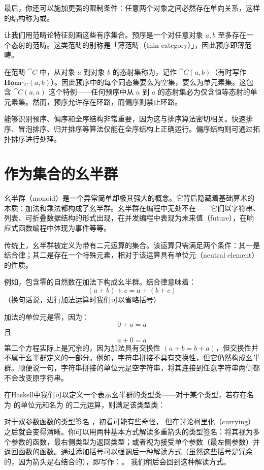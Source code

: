 最后，你还可以施加更强的限制条件：任意两个对象之间必然存在单向关系，这样的结构称为或。

让我们用范畴论特征刻画这些有序集合。预序是一个对任意对象 $a,b$ 至多存在一个态射的范畴。这类范畴的别称是「薄范畴（thin category）」，因此预序即薄范畴。

在范畴 $\cat{C}$ 中，从对象 $a$ 到对象 $b$ 的态射集称为，记作 $\cat{C}(a, b)$（有时写作 $\mathbf{Hom}_{\cat{C}}(a, b)$）。因此预序中的每个同态集要么为空集，要么为单元素集。这包含 $\cat{C}(a, a)$ 这个特例——任何预序中从 $a$ 到 $a$ 的态射集必为仅含恒等态射的单元素集。然而，预序允许存在环路，而偏序则禁止环路。

能够识别预序、偏序和全序结构非常重要，因为这与排序算法密切相关。快速排序、冒泡排序、归并排序等算法仅能在全序结构上正确运行。偏序结构则可通过拓扑排序进行处理。

\section{作为集合的幺半群}

幺半群（monoid）是一个异常简单却极其强大的概念。它背后隐藏着基础算术的本质：加法和乘法都构成了幺半群。幺半群在编程中无处不在——它们以字符串、列表、可折叠数据结构的形式出现，在并发编程中表现为未来值（future），在响应式函数编程中体现为事件等等。

传统上，幺半群被定义为带有二元运算的集合。该运算只需满足两个条件：其一是结合律；其二是存在一个特殊元素，相对于该运算具有单位元（neutral element）的性质。

例如，包含零的自然数在加法下构成幺半群。结合律意味着：
$$(a + b) + c = a + (b + c)$$
（换句话说，进行加法运算时我们可以省略括号）

加法的单位元是零，因为：
$$0 + a = a$$
且
$$a + 0 = a$$
第二个方程实际上是冗余的，因为加法具有交换性 $(a + b = b + a)$，但交换性并不属于幺半群定义的一部分。例如，字符串拼接不具有交换性，但它仍然构成幺半群。顺便说一句，字符串拼接的单位元是空字符串，将其连接到任意字符串两侧都不会改变原字符串。

在Haskell中我们可以定义一个表示幺半群的类型类——对于某个类型，若存在名为  的单位元和名为  的二元运算，则满足该类型类：

对于双参数函数的类型签名 ，初看可能有些奇怪，
但在讨论柯里化（currying）之后就会变得清晰。你可以用两种基本方式解读多重箭头的类型签名：将其视为多个参数的函数，最右侧类型为返回类型；或者视为接受单个参数（最左侧参数）并返回函数的函数。通过添加括号可以强调后一种解读方式（虽然这些括号是冗余的，因为箭头是右结合的），即写作：。
我们稍后会回到这种解读方式。

